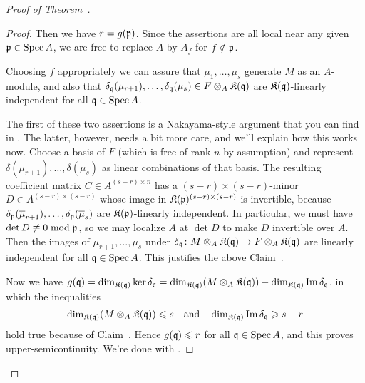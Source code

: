 \documentclass[a4paper,parskip=half,numbers=enddot, DIV=12]{scrreprt}
\renewcommand{\geq}{\geqslant}
\renewcommand{\leq}{\leqslant}
\begin{document}
\begin{proof}[Proof of Theorem~]
\begin{proof}
		Then we have $r=g(\mathfrak{p})$. Since the assertions are all local near any given $\mathfrak{p}\in\operatorname{Spec} A$, we are free to replace $A$ by $A_f$ for $f\notin\mathfrak{p}$.
		\begin{claim}
			Choosing $f$ appropriately we can assure that $\mu_1,\ldots,\mu_s$ generate $M$ as an $A$-module, and also that $\delta_{\mathfrak{q}}(\mu_{r+1}),\ldots,\delta_{\mathfrak{q}}(\mu_s)\in F\otimes_A\mathfrak{K}(\mathfrak{q})$ are $\mathfrak{K}(\mathfrak{q})$-linearly independent for all $\mathfrak{q}\in\operatorname{Spec} A$. 
		\end{claim}
		The first of these two assertions is a Nakayama-style argument that you can find in  \cite[Lemma~1.5.1]{alg2}. The latter, however, needs a bit more care, and we'll explain how this works now. Choose a basis of $F$ (which is free of rank $n$ by assumption) and represent $\delta(\mu_{r+1}),\ldots,\delta(\mu_s)$ as linear combinations of that basis. The resulting coefficient matrix $C\in A^{(s-r)\times n}$ has a $(s-r)\times (s-r)$-minor $D\in A^{(s-r)\times (s-r)}$ whose image in $\mathfrak{K}(\mathfrak{p})^{(s-r)\times (s-r)}$ is invertible, because $\delta_{\mathfrak{p}}(\overline{\mu}_{r+1}),\ldots,\delta_{\mathfrak{p}}(\overline{\mu}_s)$ are $\mathfrak{K}(\mathfrak{p})$-linearly independent. In particular, we must have $\operatorname{det} D\not\equiv 0\bmod \mathfrak{p}$, so we may localize $A$ at $\det D$ to make $D$ invertible over $A$. Then the images of $\mu_{r+1},\ldots,\mu_s$ under $\delta_\qq\colon M\otimes_A\KK(\qq)\morphism F\otimes_A\KK(\qq)$ are linearly independent for all $\mathfrak{q}\in\operatorname{Spec} A$. This justifies the above Claim~.
		
		Now we have $g(\mathfrak{q})=\dim_{\mathfrak{K}(\mathfrak{q})}\ker\delta_{\mathfrak{q}}=\dim_{\mathfrak{K}(\mathfrak{q})}(M\otimes_A\mathfrak{K}(\mathfrak{q}))-\dim_{\mathfrak{K}(\mathfrak{q})}\operatorname{Im}\delta_{\mathfrak{q}}$, in which the inequalities
		\begin{align}\lbl{eq:dimIneqs}
			\dim_{\KK(\qq)}(M\otimes_A\KK(\qq))\leq s\quad\text{and}\quad\dim_{\KK(\qq)}\Im\delta_\qq\geq s-r
		\end{align}
		hold true because of Claim~. Hence $g(\qq)\leq r$ for all $\mathfrak{q}\in\operatorname{Spec} A$, and this proves upper-semicontinuity. We're done with .
		

\end{proof}
\end{proof}
\end{document}
